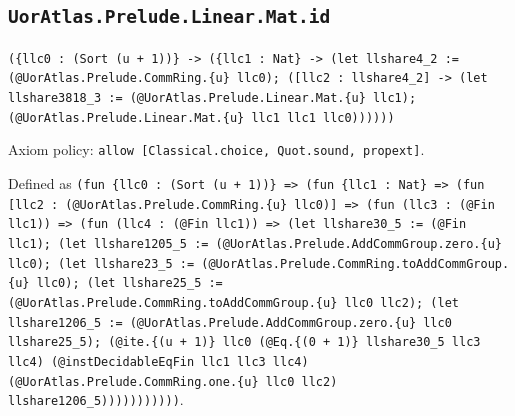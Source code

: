 \documentclass[11pt]{article}
\begin{document}
\subsection*{\texttt{UorAtlas.Prelude.Linear.Mat.id}}
\noindent\texttt{(\{llc0 : (Sort (u + 1))\} -> (\{llc1 : Nat\} -> (let llshare4\_2 := (@UorAtlas.Prelude.CommRing.\{u\} llc0); ([llc2 : llshare4\_2] -> (let llshare3818\_3 := (@UorAtlas.Prelude.Linear.Mat.\{u\} llc1); (@UorAtlas.Prelude.Linear.Mat.\{u\} llc1 llc1 llc0))))))}\par
\noindent Axiom policy: \texttt{allow [Classical.choice, Quot.sound, propext]}.\par
\noindent Defined as \texttt{(fun \{llc0 : (Sort (u + 1))\} => (fun \{llc1 : Nat\} => (fun [llc2 : (@UorAtlas.Prelude.CommRing.\{u\} llc0)] => (fun (llc3 : (@Fin llc1)) => (fun (llc4 : (@Fin llc1)) => (let llshare30\_5 := (@Fin llc1); (let llshare1205\_5 := (@UorAtlas.Prelude.AddCommGroup.zero.\{u\} llc0); (let llshare23\_5 := (@UorAtlas.Prelude.CommRing.toAddCommGroup.\{u\} llc0); (let llshare25\_5 := (@UorAtlas.Prelude.CommRing.toAddCommGroup.\{u\} llc0 llc2); (let llshare1206\_5 := (@UorAtlas.Prelude.AddCommGroup.zero.\{u\} llc0 llshare25\_5); (@ite.\{(u + 1)\} llc0 (@Eq.\{(0 + 1)\} llshare30\_5 llc3 llc4) (@instDecidableEqFin llc1 llc3 llc4) (@UorAtlas.Prelude.CommRing.one.\{u\} llc0 llc2) llshare1206\_5)))))))))))}.\par
\end{document}
